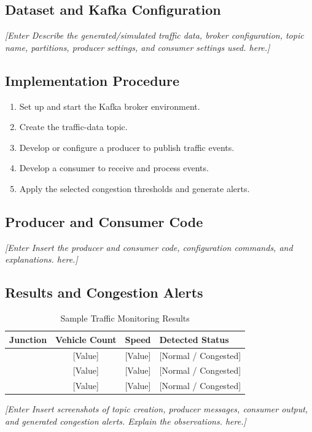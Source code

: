 \documentclass[12pt,a4paper]{report}
\newcommand{\placeholder}[1]{\textit{[Enter #1 here.]}}
\begin{document}
\subsection{Dataset and Kafka Configuration}
\placeholder{Describe the generated/simulated traffic data, broker
configuration, topic name, partitions, producer settings, and consumer
settings used.}

\subsection{Implementation Procedure}
\begin{enumerate}
    \item Set up and start the Kafka broker environment.
    \item Create the traffic-data topic.
    \item Develop or configure a producer to publish traffic events.
    \item Develop a consumer to receive and process events.
    \item Apply the selected congestion thresholds and generate alerts.
\end{enumerate}

\subsection{Producer and Consumer Code}
\placeholder{Insert the producer and consumer code, configuration
commands, and explanations.}

\subsection{Results and Congestion Alerts}
\begin{table}[H]
\centering
\caption{Sample Traffic Monitoring Results}
\begin{tabularx}{\textwidth}{|l|c|c|X|}
\hline
\textbf{Junction} & \textbf{Vehicle Count} & \textbf{Speed} & \textbf{Detected Status}\\
\hline
[Junction 1] & [Value] & [Value] & [Normal / Congested]\\
\hline
[Junction 2] & [Value] & [Value] & [Normal / Congested]\\
\hline
[Junction 3] & [Value] & [Value] & [Normal / Congested]\\
\hline
\end{tabularx}
\end{table}
\placeholder{Insert screenshots of topic creation, producer messages,
consumer output, and generated congestion alerts. Explain the observations.}
\end{document}
